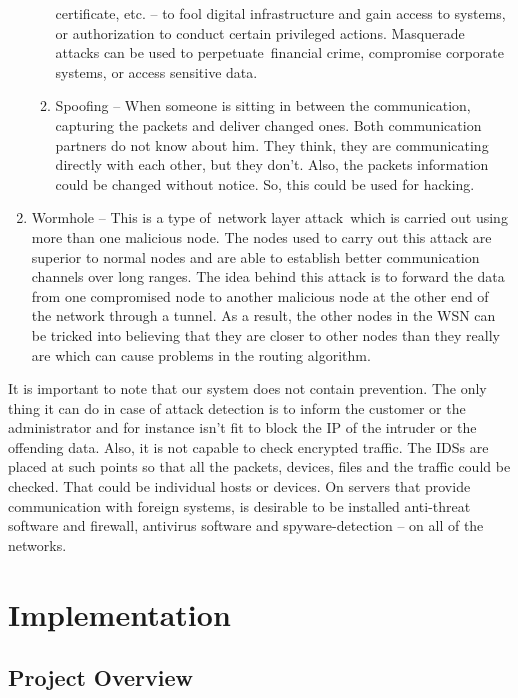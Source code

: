 \documentclass[oneside, english]{reports/assets/sdqtechreport}
\begin{document}
\begin{enumerate}
\begin{enumerate}
		            certificate, etc. – to fool digital infrastructure and gain access to systems,
		            or authorization to conduct certain privileged actions. Masquerade attacks can
		            be used to perpetuate financial crime, compromise corporate systems, or access
		            sensitive data.
		      \item Spoofing – When someone is sitting in between the communication, capturing the
		            packets and deliver changed ones. Both communication partners do not know about
		            him. They think, they are communicating directly with each other, but they
		            don't. Also, the packets information could be changed without notice. So, this
		            could be used for hacking.
	      \end{enumerate}
	\item Wormhole – This is a type of network layer attack which is carried out using
	      more than one malicious node. The nodes used to carry out this attack are
	      superior to normal nodes and are able to establish better communication
	      channels over long ranges. The idea behind this attack is to forward the data
	      from one compromised node to another malicious node at the other end of the
	      network through a tunnel. As a result, the other nodes in the WSN can be
	      tricked into believing that they are closer to other nodes than they really are
	      which can cause problems in the routing algorithm.
\end{enumerate}

It is important to note that our system does not contain prevention. The only
thing it can do in case of attack detection is to inform the customer or the
administrator and for instance isn’t fit to block the IP of the intruder or the
offending data. Also, it is not capable to check encrypted traffic. The IDSs
are placed at such points so that all the packets, devices, files and the
traffic could be checked. That could be individual hosts or devices. On servers
that provide communication with foreign systems, is desirable to be installed
anti-threat software and firewall, antivirus software and spyware-detection –
on all of the networks.

\chapter{Implementation}
\label{chap:Implementation}

\section{Project Overview}
\label{sec:ProjectOverview}
\end{document}
